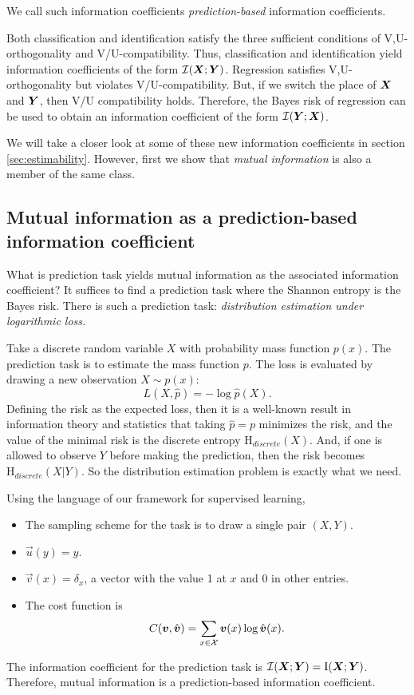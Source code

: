 \documentclass[12pt]{article}
\begin{document}
We call such information coefficients \emph{prediction-based}
information coefficients.

Both classification and identification satisfy the three sufficient
conditions of V,U-orthogonality and V/U-compatibility.  Thus,
classification and identification yield information coefficients of
the form $\mathcal{I}(\boldsymbol{X}; \boldsymbol{Y})$.  Regression satisfies
V,U-orthogonality but violates V/U-compatibility. But, if we switch
the place of $\boldsymbol{X}$ and $\boldsymbol{Y}$, then V/U compatibility holds.
Therefore, the Bayes risk of regression can be used to obtain an
information coefficient of the form $\mathcal{I}(\boldsymbol{Y}; \boldsymbol{X})$.

We will take a closer look at some of these new information
coefficients in section \ref{sec:estimability}.  However, first we show that \emph{mutual
information} is also a member of the same class.

\subsection{Mutual information as a prediction-based information coefficient}

What is prediction task yields mutual information as the associated
information coefficient?  It suffices to find a prediction task where
the Shannon entropy is the Bayes risk.  There is such a prediction
task: \emph{distribution estimation under logarithmic loss.}

Take a discrete random variable $X$ with probability mass function $p(x)$.
The prediction task is to estimate the mass function $p$.
The loss is evaluated by drawing a new observation $X \sim p(x)$:
\[
L(X, \hat{p}) = -\log \hat{p}(X).
\]
Defining the risk as the expected loss, then it is a well-known result
in information theory and statistics that taking $\hat{p} = p$
minimizes the risk, and the value of the minimal risk is the discrete
entropy $\text{H}_{discrete}(X)$. And, if one is allowed to observe
$Y$ before making the prediction, then the risk becomes
$\text{H}_{discrete}(X|Y)$.  So the distribution estimation problem is
exactly what we need.

Using the language of our framework for supervised learning,
\begin{itemize}
\item The sampling scheme for the task is to draw a single pair $(X, Y)$.
\item $\vec{u}(y) = y$.
\item $\vec{v}(x) = \delta_x$, a vector with the value 1 at $x$ and 0 in other entries.
\item The cost function is
\[
C(\boldsymbol{v}, \hat{\boldsymbol{v}}) = \sum_{x \in \mathcal{X}} \boldsymbol{v}(x) \log \hat{\boldsymbol{v}}(x).
\]
\end{itemize}
The information coefficient for the prediction task is $\mathcal{I}(\boldsymbol{X}; \boldsymbol{Y}) = \text{I}(\boldsymbol{X}; \boldsymbol{Y})$.
Therefore, mutual information is a prediction-based information coefficient.
\end{document}
